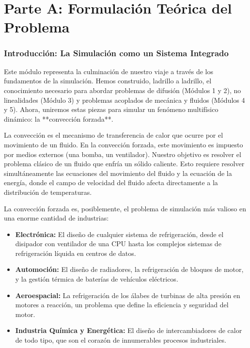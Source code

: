\part*{Parte A: Formulación Teórica del Problema}

\section{Introducción: La Simulación como un Sistema Integrado}
Este módulo representa la culminación de nuestro viaje a través de los fundamentos de la simulación. Hemos construido, ladrillo a ladrillo, el conocimiento necesario para abordar problemas de difusión (Módulos 1 y 2), no linealidades (Módulo 3) y problemas acoplados de mecánica y fluidos (Módulos 4 y 5). Ahora, uniremos estas piezas para simular un fenómeno multifísico dinámico: la **convección forzada**.

La convección es el mecanismo de transferencia de calor que ocurre por el movimiento de un fluido. En la convección forzada, este movimiento es impuesto por medios externos (una bomba, un ventilador). Nuestro objetivo es resolver el problema clásico de un fluido que enfría un sólido caliente. Esto requiere resolver simultáneamente las ecuaciones del movimiento del fluido y la ecuación de la energía, donde el campo de velocidad del fluido afecta directamente a la distribución de temperaturas.

\begin{infobox}
La convección forzada es, posiblemente, el problema de simulación más valioso en una enorme cantidad de industrias:
\begin{itemize}
    \item \textbf{Electrónica:} El diseño de cualquier sistema de refrigeración, desde el disipador con ventilador de una CPU hasta los complejos sistemas de refrigeración líquida en centros de datos.
    \item \textbf{Automoción:} El diseño de radiadores, la refrigeración de bloques de motor, y la gestión térmica de baterías de vehículos eléctricos.
    \item \textbf{Aeroespacial:} La refrigeración de los álabes de turbinas de alta presión en motores a reacción, un problema que define la eficiencia y seguridad del motor.
    \item \textbf{Industria Química y Energética:} El diseño de intercambiadores de calor de todo tipo, que son el corazón de innumerables procesos industriales.
\end{itemize}
\end{infobox}


